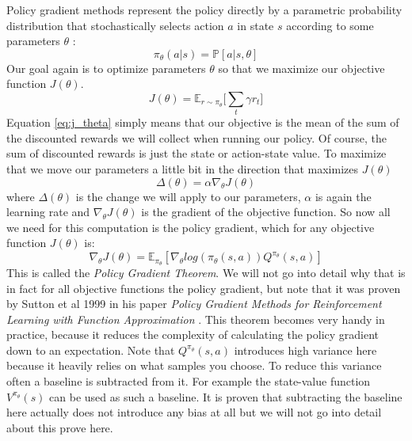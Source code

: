 Policy gradient methods represent the policy directly by a parametric probability distribution that stochastically selects action $a$ in state $s$ according to some parameters $\theta$ \cite{policy_gradient_silver}:
\begin{equation} \label{eq:pi_theta}
	\pi_{\theta}(a | s) = \mathbb{P}[a | s, \theta]
\end{equation}
Our goal again is to optimize parameters $\theta$ so that we maximize our objective function $J(\theta)$.
\begin{equation} \label{eq:j_theta}
	J(\theta) = \mathbb{E}_{r \sim \pi_{\theta}} \Big[\sum_t \gamma r_t\Big]
\end{equation}
Equation \ref{eq:j_theta} simply means that our objective is the mean of the sum of the discounted rewards we will collect when running our policy.
Of course, the sum of discounted rewards is just the state or action-state value.
To maximize that we move our parameters a little bit in the direction that maximizes $J(\theta)$
\begin{equation} \label{delta_theta}
	\Delta(\theta) = \alpha \nabla_{\theta}J(\theta)
\end{equation}
where $\Delta(\theta)$ is the change we will apply to our parameters,
$\alpha$ is again the learning rate and
$\nabla_{\theta}J(\theta)$ is the gradient of the objective function.
So now all we need for this computation is the policy gradient, which for any objective function $J(\theta)$ is:
\begin{equation} \label{eq:p_g_theorem}
	\nabla_{\theta}J(\theta) = \mathbb{E}_{\pi_{\theta}}[\nabla_{\theta}log(\pi_{\theta}(s,a))Q^{\pi_{\theta}}(s,a)]
\end{equation}
This is called the \emph{Policy Gradient Theorem}.
We will not go into detail why that is in fact for all objective functions the policy gradient, but note that it was proven by Sutton et al 1999 in his paper \emph{Policy Gradient Methods for Reinforcement Learning with Function Approximation} \cite{policy_gradient_sutton}.
This theorem becomes very handy in practice, because it reduces the complexity of calculating the policy gradient down to an expectation.
Note that $Q^{\pi_{\theta}}(s,a)$ introduces high variance here because it heavily relies on what samples you choose.
To reduce this variance often a baseline is subtracted from it.
For example the state-value function $V^{\pi_{\theta}}(s)$ can be used as such a baseline.
It is proven that subtracting the baseline here actually does not introduce any bias at all but we will not go into detail about this prove here.


